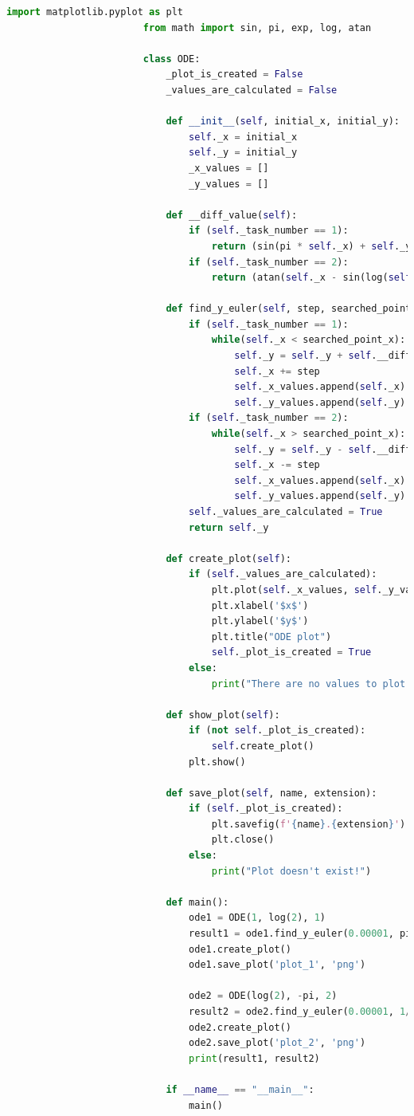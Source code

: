 \documentclass[14pt, a4paper]{extarticle}
\begin{document}
\begin{enumerate}
					\pagebreak
					\begin{lstlisting}[language=Python, frame=single, gobble=12, tabsize=2]
						import matplotlib.pyplot as plt
						from math import sin, pi, exp, log, atan
						
						class ODE:
							_plot_is_created = False
							_values_are_calculated = False
						
							def __init__(self, initial_x, initial_y):
								self._x = initial_x
								self._y = initial_y
								_x_values = []
								_y_values = []
						
							def __diff_value(self):
								if (self._task_number == 1):
									return (sin(pi * self._x) + self._y**2 * exp(-self._y**2))/self._x
								if (self._task_number == 2):
									return (atan(self._x - sin(log(self._x) - self._x * self._y)) + 1)
						
							def find_y_euler(self, step, searched_point_x):
								if (self._task_number == 1):
									while(self._x < searched_point_x):
										self._y = self._y + self.__diff_value() * step
										self._x += step
										self._x_values.append(self._x)
										self._y_values.append(self._y)
								if (self._task_number == 2):
									while(self._x > searched_point_x):
										self._y = self._y - self.__diff_value() * step
										self._x -= step
										self._x_values.append(self._x)
										self._y_values.append(self._y)
								self._values_are_calculated = True
								return self._y
						
							def create_plot(self):
								if (self._values_are_calculated):
									plt.plot(self._x_values, self._y_values)
									plt.xlabel('$x$')
									plt.ylabel('$y$')
									plt.title("ODE plot")
									self._plot_is_created = True
								else:
									print("There are no values to plot!")
						
							def show_plot(self):
								if (not self._plot_is_created):
									self.create_plot()
								plt.show()
						
							def save_plot(self, name, extension):
								if (self._plot_is_created):
									plt.savefig(f'{name}.{extension}')
									plt.close()
								else:
									print("Plot doesn't exist!")
						
							def main():
								ode1 = ODE(1, log(2), 1)
								result1 = ode1.find_y_euler(0.00001, pi)
								ode1.create_plot()
								ode1.save_plot('plot_1', 'png')
								
								ode2 = ODE(log(2), -pi, 2)
								result2 = ode2.find_y_euler(0.00001, 1/exp(2))
								ode2.create_plot()
								ode2.save_plot('plot_2', 'png')
								print(result1, result2)
								
							if __name__ == "__main__":
								main()
					\end{lstlisting}
			\end{enumerate}
			\pagebreak
			
\end{document}
